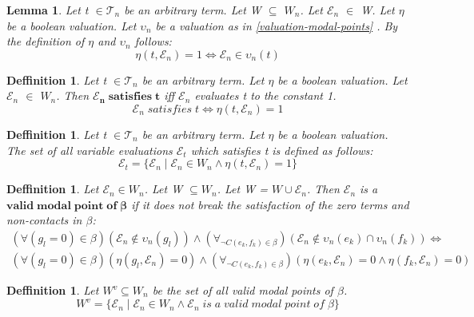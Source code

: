 \documentclass{article}
\newcommand\E{\mathcal{E}}
\newcommand\Tn{\mathcal{T}_n}
\newtheorem{lemma}[theorem]{Lemma}
\newtheorem{defn}[theorem]{Deffinition}
\begin{document}
		\begin{lemma}
			Let t $\in \Tn$ be an arbitrary term. Let W $\subseteq$ $W_n$. Let $\E_n$ $\in$ W. Let $\eta$ be a boolean valuation. Let $\upsilon_n$ be a valuation as in \ref{valuation-modal-points} . By the definition of $\eta$ and $\upsilon_n$ follows:
			\begin{equation}
				\eta(t, \E_n) = 1 \iff \E_n \in \upsilon_n(t)
			\end{equation}
		\end{lemma}

		\begin{defn}
			Let t $\in \Tn$ be an arbitrary term. Let $\eta$ be a boolean valuation. Let $\E_n$ $\in$ $W_n$. Then $\mathbf{\E_n \; satisfies \; t}$ iff $\E_n$ evaluates t to the constant 1.
			\begin{equation}
				\E_n \; satisfies \; t \iff \eta(t, \E_n) = 1
			\end{equation}
		\end{defn}

		\begin{defn}
			Let t $\in \Tn$ be an arbitrary term. Let $\eta$ be a boolean valuation. The set of all variable evaluations $\E_t$ which satisfies t is defined as follows:
			\begin{equation}
				\E_t = \{ \E_n \mid \E_n \in W_n \land \eta(t, \E_n) = 1 \}
			\end{equation}
		\end{defn}

		\begin{defn}
			Let $\E_n \in W_n$. Let W $\subseteq W_n$. Let W = $W \cup {\E_n}$. Then $\E_n$ is a $\mathbf{valid \; modal \; point \; of \; \beta}$ if it does not break the satisfaction of the zero terms and non-contacts in $\beta$:
			\begin{align*}
				(\forall (g_l = 0) \in \beta)(\E_n \notin \upsilon_n(g_l)) \land
				(\forall_{\neg C(e_k, f_k) \in \beta})(\E_n \notin \upsilon_n(e_k) \cap \upsilon_n(f_k)) \iff \\
				(\forall (g_l = 0) \in \beta)(\eta(g_l, \E_n) = 0) \land
				(\forall_{\neg C(e_k, f_k) \in \beta})(\eta(e_k, \E_n) = 0 \land \eta(f_k, \E_n) = 0)
			\end{align*}
		\end{defn}

		\begin{defn}\label{set-all-valid-modal-points}
			Let $W^v \subseteq W_n$ be the set of all valid modal points of $\beta$.
			\begin{equation}
				W^v = \{ \E_n \mid \E_n \in W_n \land \E_n \; is \; a \; valid \; modal \; point \; of \; \beta \}
			\end{equation}
		\end{defn}
\end{document}
